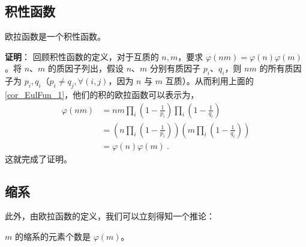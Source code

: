 \subsection{积性函数}
\begin{theorem}{}
欧拉函数是一个积性函数。
\end{theorem}
\textbf{证明}：
回顾积性函数的定义，对于互质的 $n, m$，要求 $\varphi(n m ) = \varphi(n) \varphi(m)$。将 $n$、$m$ 的质因子列出，假设 $n$、$m$ 分别有质因子 $p_i$、$q_i$，则 $nm$ 的所有质因子为 $p_i, q_i$（$p_i \neq q_j, \forall (i, j)$，因为 $n$ 与 $m$ 互质）。从而利用上面的\autoref{cor_EulFun_1}，他们的积的欧拉函数可以表示为，
\begin{equation}
\begin{aligned}
\varphi(n m) &= nm \prod_i \left(1-\frac1{p_i}\right) \prod_i \left(1-\frac1{q_i}\right)\\
&= \left(n \prod_i \left(1 - \frac1{p_i}\right)\right) \left(m \prod_i \left(1 - \frac1{q_i}\right)\right)\\
&= \varphi(n) \varphi(m) ~.
\end{aligned}
\end{equation}
这就完成了证明。



\subsection{缩系}
此外，由欧拉函数的定义，我们可以立刻得知一个推论：
\begin{corollary}{}
$m$ 的缩系的元素个数是 $\varphi(m)$。
\end{corollary}